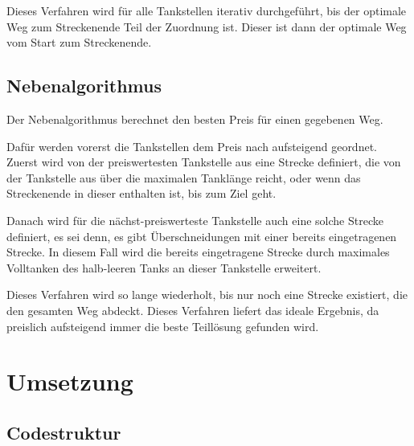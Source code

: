 \documentclass[a4paper,10pt,ngerman]{scrartcl}
\begin{document}
Dieses Verfahren wird für alle Tankstellen iterativ durchgeführt, bis der optimale Weg zum Streckenende Teil der Zuordnung ist. Dieser ist dann der optimale Weg vom Start zum Streckenende.

\subsection{Nebenalgorithmus}

Der Nebenalgorithmus berechnet den besten Preis für einen gegebenen Weg. 

Dafür werden vorerst die Tankstellen dem Preis nach aufsteigend geordnet. Zuerst wird von der preiswertesten Tankstelle aus eine Strecke definiert, die von der Tankstelle aus über die maximalen Tanklänge reicht, oder wenn das Streckenende in dieser enthalten ist, bis zum Ziel geht.

Danach wird für die nächst-preiswerteste Tankstelle auch eine solche Strecke definiert, es sei denn, es gibt Überschneidungen mit einer bereits eingetragenen Strecke. In diesem Fall wird die bereits eingetragene Strecke durch maximales Volltanken des halb-leeren Tanks an dieser Tankstelle erweitert.

Dieses Verfahren wird so lange wiederholt, bis nur noch eine Strecke existiert, die den gesamten Weg abdeckt. Dieses Verfahren liefert das ideale Ergebnis, da preislich aufsteigend immer die beste Teillösung gefunden wird. 

\newpage

\section{Umsetzung}

\subsection{Codestruktur}
\end{document}
